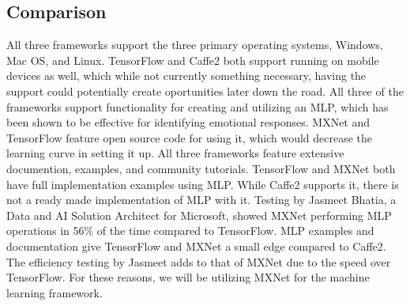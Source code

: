\documentclass[letterpaper,10pt,onecolumn]{IEEEtran}
\begin{document}
  \subsection {Comparison}
      All three frameworks support the three primary operating systems, Windows, Mac OS, and Linux. TensorFlow and Caffe2 both support running on mobile devices as well, which while not currently something necessary, having the support could potentially create oportunities later down the road. All three of the frameworks support functionality for creating and utilizing an MLP, which has been shown to be effective for identifying emotional responses. MXNet and TensorFlow feature open source code for using it, which would decrease the learning curve in setting it up. All three frameworks feature extensive documention, examples, and community tutorials. TensorFlow and MXNet both have full implementation examples using MLP. While Caffe2 supports it, there is not a ready made implementation of MLP with it. Testing by Jasmeet Bhatia, a Data and AI Solution Architect for Microsoft, showed MXNet performing MLP operations in 56\% of the time compared to TensorFlow. \cite{nn-tvm} MLP examples and documentation give TensorFlow and MXNet a small edge compared to Caffe2. The efficiency testing by Jasmeet adds to that of MXNet due to the speed over TensorFlow. For these reasons, we will be utilizing MXNet for the machine learning framework.
    \clearpage
    
    
\end{document}
